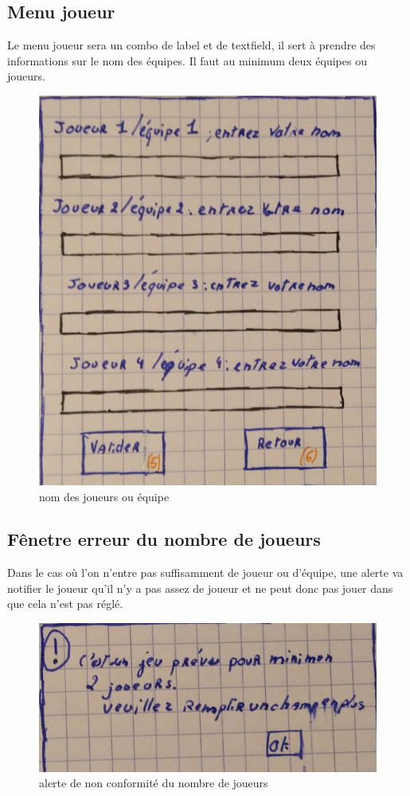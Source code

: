 \subsection{Menu joueur}
Le menu joueur sera un combo de label et de textfield, il sert à prendre des informations sur le nom des équipes. Il faut au minimum deux équipes ou joueurs.
\begin{figure}[ht]
	\centering
	\includegraphics[scale=0.5]{menu_joueur.png}
	\caption{nom des joueurs ou équipe}
	\label{interface création d'équipe}
\end{figure} 

\newpage
\subsection{Fênetre erreur du nombre de joueurs}
Dans le cas où l'on n'entre pas suffisamment de joueur ou d'équipe, une alerte va notifier le joueur qu'il n'y a pas assez de joueur et ne peut donc pas jouer dans que cela n'est pas réglé.
\begin{figure}[ht]
	\centering
	\includegraphics[scale=0.5]{fenetre_erreur_nb_joueur.png}
	\caption{alerte de non conformité du nombre de joueurs}
	\label{alerte du nombre de joueurs}
\end{figure}

